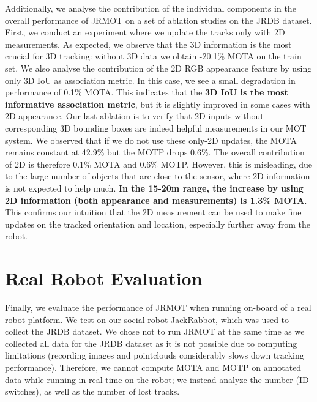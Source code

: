 \documentclass[letterpaper, 10 pt, conference]{ieeeconf}
\newcommand{\jrdb}{JRDB\xspace}
\newcommand{\jackrabbot}{JackRabbot\xspace}
\newcommand{\methodname}{{JRMOT}\xspace}
\begin{document}
Additionally, we analyse the contribution of the individual components in the overall performance of \methodname on a set of ablation studies on the \jrdb dataset. First, we conduct an experiment where we update the tracks only with 2D measurements. As expected, we observe that the 3D information is the most crucial for 3D tracking: without 3D data we obtain -20.1\% MOTA on the train set. We also analyse the contribution of the 2D RGB appearance feature by using only 3D IoU as association metric. In this case, we see a small degradation in performance of 0.1\% MOTA. This indicates that the \textbf{3D IoU is the most informative association metric}, but it is slightly improved in some cases with 2D appearance. Our last ablation is to verify that 2D inputs without corresponding 3D bounding boxes are indeed helpful measurements in our MOT system. We observed that if we do not use these only-2D updates, the MOTA remains constant at 42.9\% but the MOTP drops 0.6\%.
The overall contribution of 2D is therefore 0.1\% MOTA and 0.6\% MOTP. However, this is misleading, due to the large number of objects that are close to the sensor, where 2D information is not expected to help much. \textbf{In the 15-20m range, the increase by using 2D information (both appearance and measurements) is 1.3\% MOTA}. This confirms our intuition that the 2D measurement can be used to make fine updates on the tracked orientation and location, especially further away from the robot. 

\section{Real Robot Evaluation}
\label{s_rre}

Finally, we evaluate the performance of \methodname when running on-board of a real robot platform. We test on our social robot \jackrabbot, which was used to collect the \jrdb dataset. We chose not to run \methodname at the same time as we collected all data for the \jrdb dataset as it is not possible due to computing limitations (recording images and pointclouds considerably slows down tracking performance). Therefore, we cannot compute MOTA and MOTP on annotated data while running in real-time on the robot; we instead analyze the number (ID switches), as well as the number of lost tracks.
\end{document}
